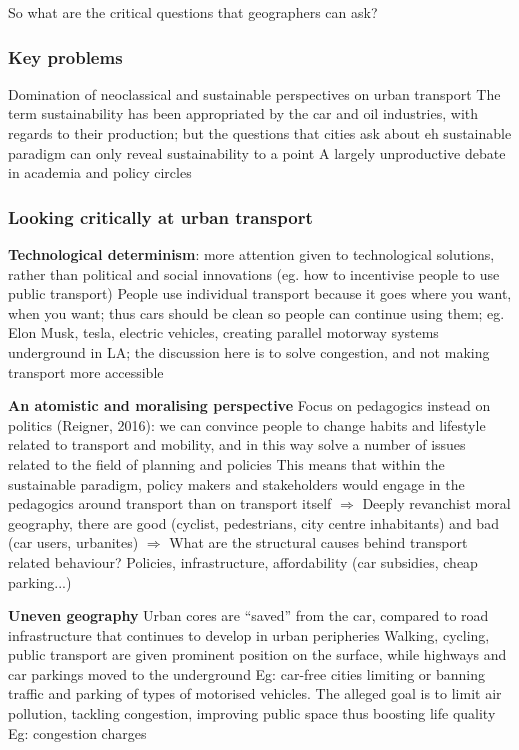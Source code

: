 \documentclass{article}
\begin{document}
So what are the critical questions that geographers can ask?

\subsubsection{Key problems}

\begin{outline}
	\1 Domination of neoclassical and sustainable perspectives on urban transport
		\2 The term sustainability has been appropriated by the car and oil industries, with regards to their production; but the questions that cities ask about eh sustainable paradigm can only reveal sustainability to a point
		\2 A largely unproductive debate in academia and policy circles
\end{outline}

\subsubsection{Looking critically at urban transport}

\begin{outline}
	\1 \textbf{Technological determinism}: more attention given to technological solutions, rather than political and social innovations (eg. how to incentivise people to use public transport)
		\2 People use individual transport because it goes where you want, when you want; thus cars should be clean so people can continue using them; eg. Elon Musk, tesla, electric vehicles, creating parallel motorway systems underground in LA; the discussion here is to solve congestion, and not making transport more accessible
		
	\1 \textbf{An atomistic and moralising perspective}
		\2 Focus on pedagogics instead on politics (Reigner, 2016): we can convince people to change habits and lifestyle related to transport and mobility, and in this way solve a number of issues related to the field of planning and policies
		\2 This means that within the sustainable paradigm, policy makers and stakeholders would engage in the pedagogics around transport than on transport itself
		\2 $\Rightarrow$ Deeply revanchist moral geography, there are good (cyclist, pedestrians, city centre inhabitants) and bad (car users, urbanites)
		\2 $\Rightarrow$ What are the structural causes behind transport related behaviour? Policies, infrastructure, affordability (car subsidies, cheap parking...)
		
	\1 \textbf{Uneven geography}
		\2 Urban cores are ``saved'' from the car, compared to road infrastructure that continues to develop in urban peripheries
		\2 Walking, cycling, public transport are given prominent position on the surface, while highways and car parkings moved to the underground
		\2 Eg: car-free cities limiting or banning traffic and parking of types of motorised vehicles. The alleged goal is to limit air pollution, tackling congestion, improving public space thus boosting life quality
		\2 Eg: congestion charges
\end{outline}
\end{document}
